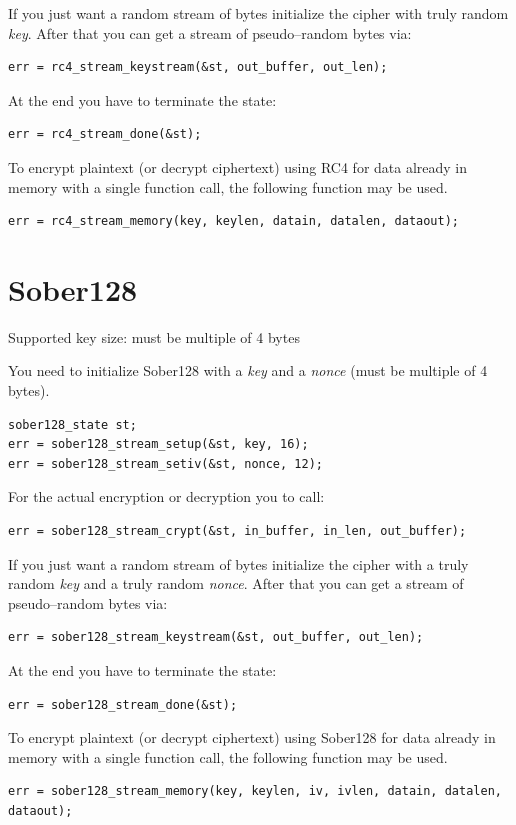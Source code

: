 \documentclass[synpaper]{book}
\newcommand{\mysection}[1]    %
	{                   %
	\section{#1}
   \markboth{\textsf{www.libtom.net}}{\thesection ~ {#1}}
	}
\begin{document}
If you just want a random stream of bytes initialize the cipher with truly random \textit{key}.
After that you can get a stream of pseudo--random bytes via:
\begin{verbatim}
err = rc4_stream_keystream(&st, out_buffer, out_len);
\end{verbatim}

At the end you have to terminate the state:
\begin{verbatim}
err = rc4_stream_done(&st);
\end{verbatim}

To encrypt plaintext (or decrypt ciphertext) using RC4 for data already in
memory with a single function call, the following function may be used.
\begin{verbatim}
err = rc4_stream_memory(key, keylen, datain, datalen, dataout);
\end{verbatim}

\mysection{Sober128}

Supported key size: must be multiple of 4 bytes

You need to initialize Sober128 with a \textit{key} and a \textit{nonce} (must be multiple of 4 bytes).
\begin{verbatim}
sober128_state st;
err = sober128_stream_setup(&st, key, 16);
err = sober128_stream_setiv(&st, nonce, 12);
\end{verbatim}

For the actual encryption or decryption you to call:
\begin{verbatim}
err = sober128_stream_crypt(&st, in_buffer, in_len, out_buffer);
\end{verbatim}

If you just want a random stream of bytes initialize the cipher with a truly random \textit{key}
and a truly random \textit{nonce}. After that you can get a stream of pseudo--random bytes via:
\begin{verbatim}
err = sober128_stream_keystream(&st, out_buffer, out_len);
\end{verbatim}

At the end you have to terminate the state:
\begin{verbatim}
err = sober128_stream_done(&st);
\end{verbatim}

To encrypt plaintext (or decrypt ciphertext) using Sober128 for data already in
memory with a single function call, the following function may be used.
\begin{verbatim}
err = sober128_stream_memory(key, keylen, iv, ivlen, datain, datalen, dataout);
\end{verbatim}
\end{document}
